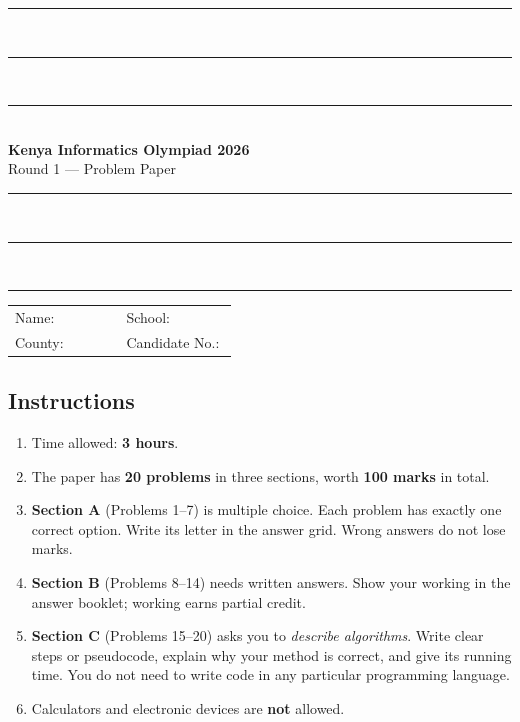 \documentclass[11pt,a4paper]{article}
\newif\ifanswers
\newcounter{prob}
\begin{document}
\begin{center}
  {\color{kioblack}\rule{\linewidth}{3pt}}\\[-2.2pt]
  {\color{kiored}\rule{\linewidth}{3pt}}\\[-2.2pt]
  {\color{kiogreen}\rule{\linewidth}{3pt}}\\[1.2em]
  {\LARGE\bfseries Kenya Informatics Olympiad 2026}\\[0.5em]
  {\Large Round 1 \ifanswers --- Marking Scheme\else --- Problem Paper\fi}\\[1em]
  {\color{kiogreen}\rule{\linewidth}{3pt}}\\[-2.2pt]
  {\color{kiored}\rule{\linewidth}{3pt}}\\[-2.2pt]
  {\color{kioblack}\rule{\linewidth}{3pt}}
\end{center}

\ifanswers\else
\vspace{0.6em}
\noindent
\begin{tabular}{@{}p{0.48\linewidth}p{0.48\linewidth}@{}}
Name: \hrulefill & School: \hrulefill \\[0.8em]
County: \hrulefill & Candidate No.: \hrulefill
\end{tabular}
\fi

\subsection*{Instructions}
\begin{enumerate}[leftmargin=2em, itemsep=0.2em]
  \item Time allowed: \textbf{3 hours}.
  \item The paper has \textbf{20 problems} in three sections, worth
        \textbf{100 marks} in total.
  \item \textbf{Section A} (Problems 1--7) is multiple choice. Each problem
        has exactly one correct option. Write its letter in the answer grid.
        Wrong answers do not lose marks.
  \item \textbf{Section B} (Problems 8--14) needs written answers. Show your
        working in the answer booklet; working earns partial credit.
  \item \textbf{Section C} (Problems 15--20) asks you to \emph{describe
        algorithms}. Write clear steps or pseudocode, explain why your method
        is correct, and give its running time. You do not need to write code
        in any particular programming language.
  \item Calculators and electronic devices are \textbf{not} allowed.
\end{enumerate}
\end{document}
